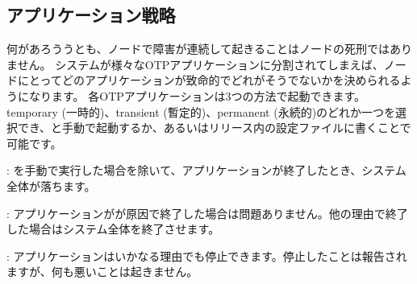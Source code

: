 \subsection{アプリケーション戦略}
\label{subsec:start-link-application-strategies}

何があろううとも、ノードで障害が連続して起きることはノードの死刑ではありません。
システムが様々なOTPアプリケーションに分割されてしまえば、ノードにとってどのアプリケーションが致命的でどれがそうでないかを決められるようになります。
各OTPアプリケーションは3つの方法で起動できます。temporary (一時的)、transient (暫定的)、permanent (永続的)のどれか一つを選択でき、と手動で起動するか、あるいはリリース内の設定ファイルに書くことで可能です。

\begin{itemize*}
  \item {}: を手動で実行した場合を除いて、アプリケーションが終了したとき、システム全体が落ちます。
  \item {}: アプリケーションがが原因で終了した場合は問題ありません。他の理由で終了した場合はシステム全体を終了させます。
  \item {}: アプリケーションはいかなる理由でも停止できます。停止したことは報告されますが、何も悪いことは起きません。  
\end{itemize*}

